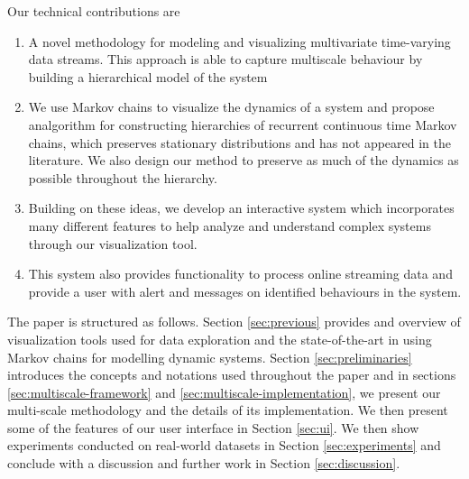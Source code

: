 Our technical contributions are
\begin{enumerate}{}
  \item A novel methodology for modeling and visualizing multivariate time-varying data streams. This approach is able to capture multiscale behaviour by building a hierarchical model of the system
  \item We use Markov chains to visualize the dynamics of a system and propose analgorithm for constructing hierarchies of recurrent continuous time Markov chains, which preserves stationary distributions and has not appeared in the literature. We also design our method to preserve as much of the dynamics as possible throughout the hierarchy.
  \item Building on these ideas, we develop an interactive system which incorporates many different features to help analyze and understand complex systems through our visualization tool.
  \item This system also provides functionality to process online streaming data and provide a user with  alert and messages on identified behaviours in the system.  
\end{enumerate}

The paper is structured as follows. Section \ref{sec:previous} provides and overview
of visualization tools used for data exploration and the state-of-the-art in using Markov chains for modelling dynamic systems.
Section \ref{sec:preliminaries} introduces the concepts and notations used throughout the paper and 
in sections \ref{sec:multiscale-framework} and \ref{sec:multiscale-implementation}, we present
our multi-scale methodology and the details of its implementation. We then present some of the 
features of our user interface in Section \ref{sec:ui}. We then show experiments conducted on real-world datasets in Section \ref{sec:experiments} and conclude with a discussion and further work in Section \ref{sec:discussion}.

